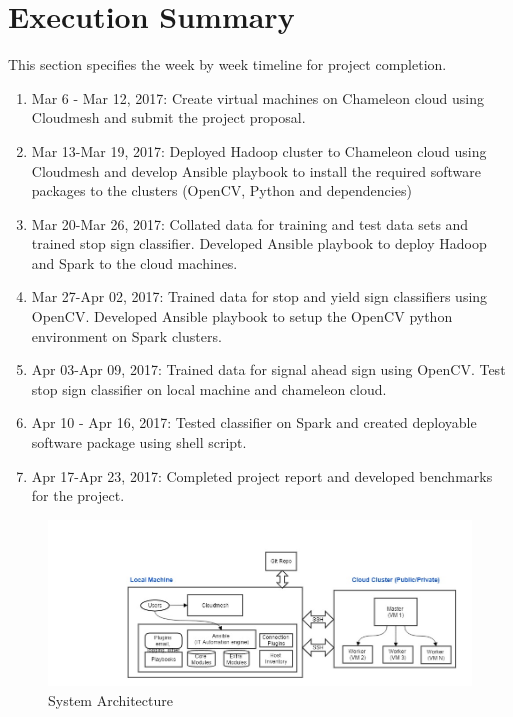 \documentclass[9pt,twocolumn,twoside]{../../styles/osajnl}
\begin{document}
\section{Execution Summary}
This section specifies the week by week timeline for project
completion.

\begin{enumerate}
\item {Mar 6 - Mar 12, 2017: } Create virtual machines on Chameleon
  cloud using Cloudmesh and submit the project proposal.
\item {Mar 13-Mar 19, 2017: } Deployed Hadoop cluster to Chameleon cloud
  using Cloudmesh and develop Ansible playbook to install the required
  software packages to the clusters (OpenCV, Python and dependencies)
\item {Mar 20-Mar 26, 2017: } Collated data for training and test data sets and trained stop sign classifier. Developed Ansible playbook to deploy Hadoop and Spark to the cloud machines.
\item {Mar 27-Apr 02, 2017: } Trained data for stop and yield sign classifiers
  using OpenCV.  Developed Ansible playbook to setup the OpenCV python environment on Spark clusters.
\item {Apr 03-Apr 09, 2017: } Trained data for signal ahead sign
  using OpenCV. Test stop sign classifier on local machine and chameleon cloud.
\item {Apr 10 - Apr 16, 2017: } Tested classifier on Spark and created deployable software package using shell script.
\item {Apr 17-Apr 23, 2017: } Completed project report and developed benchmarks for the project.
\end{enumerate}

\begin{figure}[h]\centering
\includegraphics[width=\linewidth]{images/architecture}
\caption{System Architecture}
\label{fig:enter,update & exit}
\end{figure}
\end{document}
